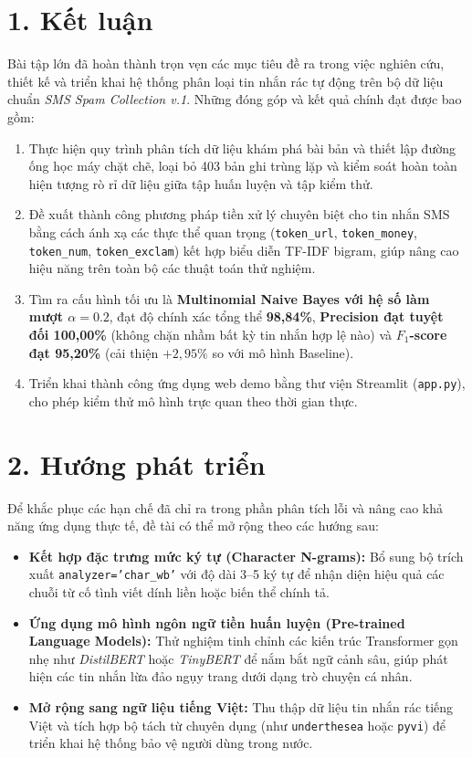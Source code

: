 \documentclass[12pt,a4paper]{report}
\begin{document}
\section*{1. Kết luận}
Bài tập lớn đã hoàn thành trọn vẹn các mục tiêu đề ra trong việc nghiên cứu, thiết kế và triển khai hệ thống phân loại tin nhắn rác tự động trên bộ dữ liệu chuẩn \textit{SMS Spam Collection v.1}. Những đóng góp và kết quả chính đạt được bao gồm:
\begin{enumerate}
    \item Thực hiện quy trình phân tích dữ liệu khám phá bài bản và thiết lập đường ống học máy chặt chẽ, loại bỏ 403 bản ghi trùng lặp và kiểm soát hoàn toàn hiện tượng rò rỉ dữ liệu giữa tập huấn luyện và tập kiểm thử.
    \item Đề xuất thành công phương pháp tiền xử lý chuyên biệt cho tin nhắn SMS bằng cách ánh xạ các thực thể quan trọng (\texttt{token\_url}, \texttt{token\_money}, \texttt{token\_num}, \texttt{token\_exclam}) kết hợp biểu diễn TF-IDF bigram, giúp nâng cao hiệu năng trên toàn bộ các thuật toán thử nghiệm.
    \item Tìm ra cấu hình tối ưu là \textbf{Multinomial Naive Bayes với hệ số làm mượt $\alpha = 0.2$}, đạt độ chính xác tổng thể \textbf{98,84\%}, \textbf{Precision đạt tuyệt đối 100,00\%} (không chặn nhầm bất kỳ tin nhắn hợp lệ nào) và \textbf{$F_1$-score đạt 95,20\%} (cải thiện $+2,95\%$ so với mô hình Baseline).
    \item Triển khai thành công ứng dụng web demo bằng thư viện Streamlit (\texttt{app.py}), cho phép kiểm thử mô hình trực quan theo thời gian thực.
\end{enumerate}

\section*{2. Hướng phát triển}
Để khắc phục các hạn chế đã chỉ ra trong phần phân tích lỗi và nâng cao khả năng ứng dụng thực tế, đề tài có thể mở rộng theo các hướng sau:
\begin{itemize}
    \item \textbf{Kết hợp đặc trưng mức ký tự (Character N-grams):} Bổ sung bộ trích xuất \texttt{analyzer='char\_wb'} với độ dài 3--5 ký tự để nhận diện hiệu quả các chuỗi từ cố tình viết dính liền hoặc biến thể chính tả.
    \item \textbf{Ứng dụng mô hình ngôn ngữ tiền huấn luyện (Pre-trained Language Models):} Thử nghiệm tinh chỉnh các kiến trúc Transformer gọn nhẹ như \textit{DistilBERT} hoặc \textit{TinyBERT} để nắm bắt ngữ cảnh sâu, giúp phát hiện các tin nhắn lừa đảo ngụy trang dưới dạng trò chuyện cá nhân.
    \item \textbf{Mở rộng sang ngữ liệu tiếng Việt:} Thu thập dữ liệu tin nhắn rác tiếng Việt và tích hợp bộ tách từ chuyên dụng (như \texttt{underthesea} hoặc \texttt{pyvi}) để triển khai hệ thống bảo vệ người dùng trong nước.
\end{itemize}
\end{document}
